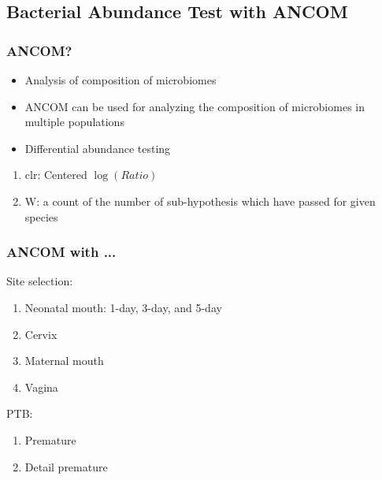 \documentclass{beamer}
\begin{document}
    \subsection{Bacterial Abundance Test with ANCOM}
    \begin{frame}
        \frametitle{ANCOM?}

        \begin{itemize}
            \item Analysis of composition of microbiomes
            \item ANCOM can be used for analyzing the composition of microbiomes in multiple populations \cite{ANCOM1}
            \item Differential abundance testing
        \end{itemize}

        \begin{enumerate}
            \item clr: Centered $\log (Ratio)$
            \item W: a count of the number of sub-hypothesis which have passed for given species
        \end{enumerate}
    \end{frame}

    \begin{frame}
        \frametitle{ANCOM with ...}

        Site selection:
        \begin{enumerate}
            \item Neonatal mouth: 1-day, 3-day, and 5-day
            \item Cervix
            \item Maternal mouth
            \item Vagina
        \end{enumerate}

        PTB:
        \begin{enumerate}
            \item Premature
            \item Detail premature
        \end{enumerate}
    \end{frame}
\end{document}
